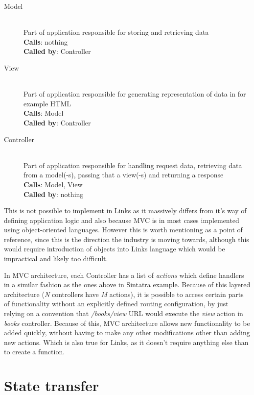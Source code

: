 \begin{description}
  \item[Model] \hfill \\
  Part of application responsible for storing and retrieving data \\
  \textbf{Calls}: nothing \\
  \textbf{Called by}: Controller
  \item[View] \hfill \\
  Part of application responsible for generating representation of data in for example HTML \\
  \textbf{Calls}: Model \\
  \textbf{Called by}: Controller
  \item[Controller] \hfill \\
  Part of application responsible for handling request data, retrieving data from a model(-s), passing that a view(-s) and returning a response \\
  \textbf{Calls}: Model, View \\
  \textbf{Called by}: nothing
\end{description}

This is not possible to implement in Links as it massively differs from it's way of defining application logic and also because MVC is in most cases implemented using object-oriented languages. However this is worth mentioning as a point of reference, since this is the direction the industry is moving towards, although this would require introduction of objects into Links language which would be impractical and likely too difficult.

In MVC architecture, each Controller has a list of \textit{actions} which define handlers in a similar fashion as the ones above in Sintatra example. Because of this layered architecture (\textit{N} controllers have \textit{M} actions), it is possible to access certain parts of functionality without an explicitly defined routing configuration, by just relying on a convention that \textit{/books/view} URL would execute the \textit{view} action in \textit{books} controller. Because of this, MVC architecture allows new functionality to be added quickly, without having to make any other modifications other than adding new actions. Which is also true for Links, as it doesn't require anything else than to create a function.

\section{State transfer}

